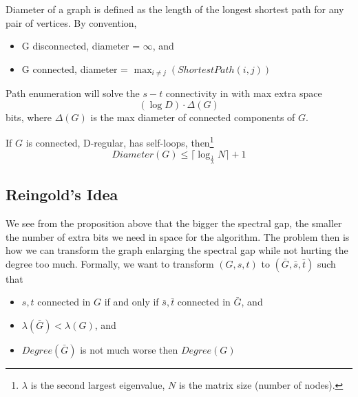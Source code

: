 \begin{definition}
	Diameter of a graph is defined as the length of the longest shortest path for any pair of vertices. By convention, 
	\begin{itemize}
		\item G disconnected, diameter = $\infty$, and
		\item G connected, diameter = $\max_{i \neq j} \left( ShortestPath (i, j) \right)$
	\end{itemize}
\end{definition}

\begin{proposition}
	Path enumeration will solve the $s-t$ connectivity in with max extra space 
	\begin{equation}
		(\log D) \cdot \Delta (G) \label{eq:path_enumeration_extra_space}
	\end{equation} 
	bits, where $\Delta (G)$ is the max diameter of connected components of $G$. 
\end{proposition}

\begin{proposition}
	If $G$ is connected, D-regular, has self-loops, then\footnote{$\lambda$ is the second largest eigenvalue, $N$ is the matrix size (number of nodes).}
	\begin{equation}
		Diameter(G) \leq \lceil \log _{\frac{1}{\lambda}} N \rceil + 1
	\end{equation}
\end{proposition}


\subsection{Reingold's Idea}\label{reingold_algo}
We see from the proposition above that the bigger the spectral gap, the smaller the number of extra bits we need in space for the algorithm. The problem then is how we can transform the graph enlarging the spectral gap while not hurting the degree too much. Formally, we want to transform $(G, s, t)$ to $(\bar G, \bar s, \bar t)$ such that 
\begin{itemize}
	\item $s, t$ connected in $G$ if and only if $\bar s, \bar t$ connected in $\bar G$, and
	\item $\lambda (\bar G) < \lambda (G)$, and
	\item $Degree(\bar G)$ is not much worse then $Degree(G)$
\end{itemize}

